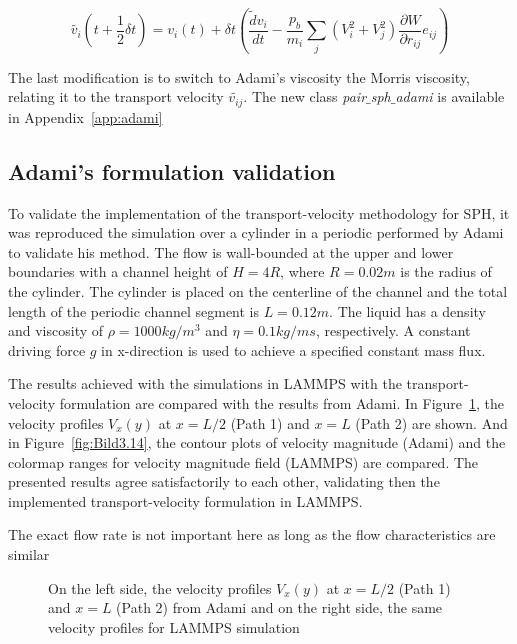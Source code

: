 \begin{equation}
\tilde {v_{i}}(t+\frac{1}{2}\delta t) = v_{i}(t) + \delta t \left( \frac{\tilde {d}v_{i}}{dt} - \frac{p_{b}}{m_{i}} \sum_{j} (V^2_{i} + V^2_{j}) \frac {\partial W}{\partial r_{ij}}e_{ij}\right)
\end{equation}

The last modification is to switch to Adami's viscosity the Morris viscosity, relating it to the transport velocity $\tilde {v_{ij}}$. The new class \textit{pair$\_$sph$\_$adami}
is available in Appendix~\ref{app:adami}

\subsection{Adami's formulation validation}
\label{sec:section 1}

To validate the implementation of the transport-velocity methodology for SPH, it was reproduced the simulation over a cylinder in a periodic performed by Adami
\cite{adami_transport-velocity_2013} to validate his method. The flow is wall-bounded at the upper and lower boundaries with a channel height of $H=4R$, where $R=0.02m$ is the 
radius of the cylinder. The cylinder is placed on the centerline of the channel and the total length of the periodic channel segment is $L=0.12m$. The liquid has a density and
viscosity of $\rho = 1000 kg/m^3$ and $\eta = 0.1 kg/ms$, respectively. A constant driving force $g$ in x-direction is used to achieve a specified constant mass flux.\par
The results achieved with the simulations in LAMMPS with the transport-velocity formulation are compared with the results from Adami. In Figure~\ref{fig:Bild3.13}, the velocity profiles
$V_{x}(y)$ at $x = L/2$ (Path 1) and $x=L$ (Path 2) are shown. And in Figure~\ref{fig:Bild3.14}, the contour plots of velocity magnitude (Adami) and the colormap ranges for velocity magnitude field (LAMMPS)
are  compared. The presented results agree satisfactorily to each other, validating then the implemented transport-velocity formulation in LAMMPS.

The exact flow rate is not important here as long as the flow characteristics are similar

\begin{figure}[H]
\centering
  \begin{footnotesize}
  
  \caption[On the left side, the velocity profiles $V_{x}(y)$ at $x = L/2$ (Path 1) and $x=L$ (Path 2) from Adami \cite{adami_transport-velocity_2013} and on the right side,
  the same velocity profiles for LAMMPS simulation]{On the left side, the velocity profiles $V_{x}(y)$ at $x = L/2$ (Path 1) and $x=L$ (Path 2) from Adami \cite{adami_transport-velocity_2013} and on the right side,
  the same velocity profiles for LAMMPS simulation}
  \label{fig:Bild3.13}
  \end{footnotesize}
\end{figure} 



